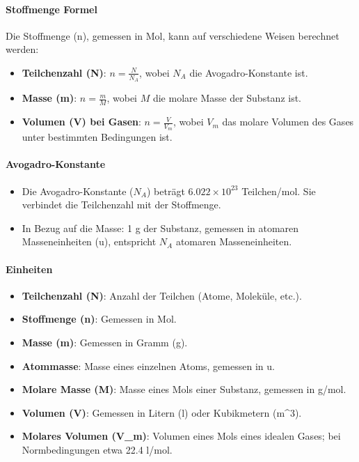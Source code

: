 \documentclass{vorlage-design-main}
\begin{document}
\hypertarget{stoffmenge-formel}{%
\paragraph{Stoffmenge Formel}\label{stoffmenge-formel}}

Die Stoffmenge (n), gemessen in Mol, kann auf verschiedene Weisen
berechnet werden:

\begin{itemize}

\item
  \textbf{Teilchenzahl (N)}: $n = \frac{N}{N_A}$, wobei $N_A$ die
  Avogadro-Konstante ist.
\item
  \textbf{Masse (m)}: $n = \frac{m}{M}$, wobei $M$ die molare Masse
  der Substanz ist.
\item
  \textbf{Volumen (V) bei Gasen}: $n = \frac{V}{V_m}$, wobei $V_m$
  das molare Volumen des Gases unter bestimmten Bedingungen ist.
\end{itemize}

\hypertarget{avogadro-konstante}{%
\paragraph{Avogadro-Konstante}\label{avogadro-konstante}}

\begin{itemize}

\item
  Die Avogadro-Konstante ($N_A$) beträgt $6.022 \times 10^{23}$
  Teilchen/mol. Sie verbindet die Teilchenzahl mit der Stoffmenge.
\item
  In Bezug auf die Masse: 1 g der Substanz, gemessen in atomaren
  Masseneinheiten (u), entspricht $N_A$ atomaren Masseneinheiten.
\end{itemize}

\hypertarget{einheiten}{%
\paragraph{Einheiten}\label{einheiten}}

\begin{itemize}

\item
  \textbf{Teilchenzahl (N)}: Anzahl der Teilchen (Atome, Moleküle,
  etc.).
\item
  \textbf{Stoffmenge (n)}: Gemessen in Mol.
\item
  \textbf{Masse (m)}: Gemessen in Gramm (g).
\item
  \textbf{Atommasse}: Masse eines einzelnen Atoms, gemessen in u.
\item
  \textbf{Molare Masse (M)}: Masse eines Mols einer Substanz, gemessen
  in g/mol.
\item
  \textbf{Volumen (V)}: Gemessen in Litern (l) oder Kubikmetern
  (m\^{}3).
\item
  \textbf{Molares Volumen (V\_m)}: Volumen eines Mols eines idealen
  Gases; bei Normbedingungen etwa 22.4 l/mol.
\end{itemize}
\end{document}
